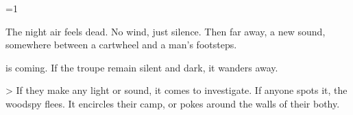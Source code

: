 \ifnum\value{cycle}=1

\begin{boxtext}
  The night air feels dead.
  No wind, just silence.
  Then far away, a new sound, somewhere between a cartwheel and a man's footsteps.
\end{boxtext}

 is coming.
If the troupe remain silent and dark, it wanders away.

\woodspy

\ifnum\value{r12}>\value{hp}%
  If they make any light or sound, it comes to investigate.
  If anyone spots it, the \gls{woodspy} flees.
\else%
  It encircles their camp, or pokes around the walls of their \gls{bothy}.
\fi%

\fi
